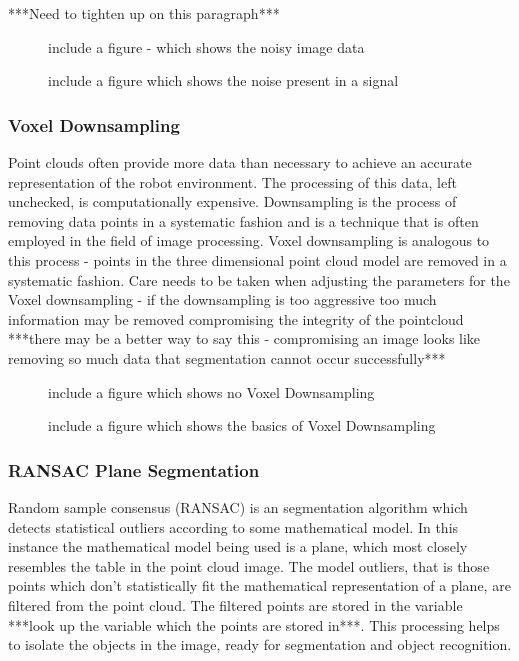 \documentclass[a4paper]{article}
\begin{document}
***Need to tighten up on this paragraph***

\begin{figure}
\begin{minipage}{0.45\linewidth}
\centering
\caption{include a figure - which shows the noisy image data}
\end{minipage}
\begin{minipage}{0.45\linewidth}
\centering
\caption{include a figure which shows the noise present in a signal }
\end{minipage}
\end{figure}

\subsubsection{Voxel Downsampling}
Point clouds often provide more data than necessary to achieve an accurate representation of the robot environment. The processing of this data, left unchecked, is computationally expensive. Downsampling is the process of removing data points in a systematic fashion and is a technique that is often employed in the field of image processing. Voxel downsampling is analogous to this process - points in the three dimensional point cloud model are removed in a systematic fashion. Care needs to be taken when adjusting the parameters for the Voxel downsampling - if the downsampling is too aggressive too much information may be removed compromising the integrity of the pointcloud ***there may be a better way to say this - compromising an image looks like removing so much data that segmentation cannot occur successfully***

\begin{figure}
\begin{minipage}{0.45\linewidth}
\centering
\caption{include a figure which shows no Voxel Downsampling}
\end{minipage}
\begin{minipage}{0.45\linewidth}
\centering
\caption{include a figure which shows the basics of Voxel Downsampling}
\end{minipage}
\end{figure}

\subsubsection{RANSAC Plane Segmentation}
Random sample consensus (RANSAC) is an segmentation algorithm which detects statistical outliers according to some mathematical model. In this instance the mathematical model being used is a plane, which most closely resembles the table in the point cloud image. The model outliers, that is those points which don't statistically fit the mathematical representation of a plane, are filtered from the point cloud. The filtered points are stored in the variable ***look up the variable which the points are stored in***. This processing helps to isolate the objects in the image, ready for segmentation and object recognition.
\end{document}
